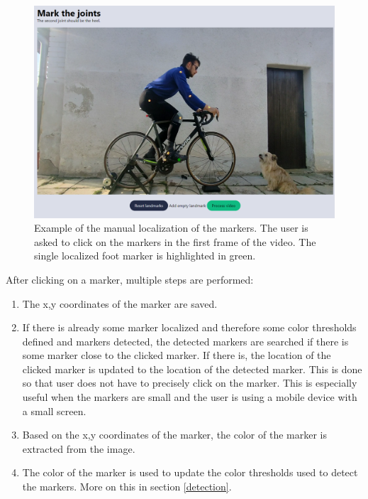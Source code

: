 \begin{figure}[htbp]
    \centering
    \includegraphics[width=\textwidth]{obrazky-figures/markers_localization.png}
    \caption{Example of the manual localization of the markers. The user is asked to click on the markers in the first frame of the video. The single localized foot marker is highlighted in green.}
    \label{fig:marker_localization}
\end{figure}




After clicking on a marker, multiple steps are performed:
\begin{enumerate}
    \item The x,y coordinates of the marker are saved.
    \item If there is already some marker localized and therefore some color thresholds defined and markers detected, the detected markers are searched if there is some marker close to the clicked marker. If there is, the location of the clicked marker is updated to the location of the detected marker. This is done so that user does not have to precisely click on the marker. This is especially useful when the markers are small and the user is using a mobile device with a small screen.
    \item Based on the x,y coordinates of the marker, the color of the marker is extracted from the image.
    \item The color of the marker is used to update the color thresholds used to detect the markers. More on this in section \ref{detection}.
\end{enumerate}

